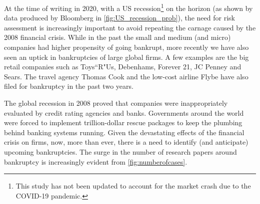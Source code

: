\label{chap:LiteratureReview}

At the time of writing in 2020, with a  US recession\footnote{This study has not been updated to account for the market crash due to the COVID-19 pandemic.} on the horizon (as shown by data produced by Bloomberg in \autoref{fig:US_recession_prob}), the need for risk assessment is increasingly important to avoid repeating the carnage caused by the 2008 financial crisis. 
While in the past the small and medium (and micro) companies had higher propensity of going bankrupt, more recently we have also seen an uptick in bankruptcies of large global firms. A few examples are the big retail companies such as Toys``R"Us, Debenhams, Forever 21, JC Penney and Sears. The travel agency Thomas Cook and the low-cost airline Flybe have also filed for bankruptcy in the past two years.

  
The global recession in 2008 proved that companies were inappropriately evaluated by credit rating agencies and banks. Governments around the world were forced to implement trillion-dollar rescue packages to keep the plumbing behind banking systems running. Given the devastating effects of the financial crisis on firms, now, more than ever, there is a need to identify (and anticipate) upcoming bankruptcies. The surge in the number of research papers around bankruptcy is increasingly evident from \autoref{fig:numberofcases}. 

  

